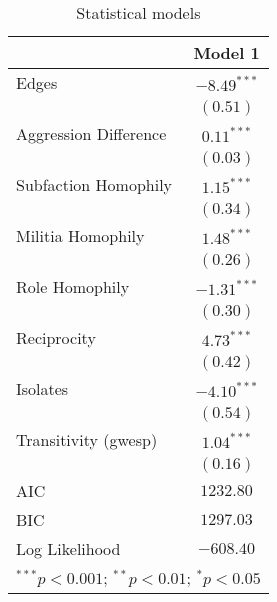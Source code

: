 
\begin{table}
\begin{center}
\begin{tabular}{l c}
\hline
 & Model 1 \\
\hline
Edges                 & $-8.49^{***}$ \\
                      & $(0.51)$      \\
Aggression Difference & $0.11^{***}$  \\
                      & $(0.03)$      \\
Subfaction Homophily  & $1.15^{***}$  \\
                      & $(0.34)$      \\
Militia Homophily     & $1.48^{***}$  \\
                      & $(0.26)$      \\
Role Homophily        & $-1.31^{***}$ \\
                      & $(0.30)$      \\
Reciprocity           & $4.73^{***}$  \\
                      & $(0.42)$      \\
Isolates              & $-4.10^{***}$ \\
                      & $(0.54)$      \\
Transitivity (gwesp)  & $1.04^{***}$  \\
                      & $(0.16)$      \\
\hline
AIC                   & $1232.80$     \\
BIC                   & $1297.03$     \\
Log Likelihood        & $-608.40$     \\
\hline
\multicolumn{2}{l}{\scriptsize{$^{***}p<0.001$; $^{**}p<0.01$; $^{*}p<0.05$}}
\end{tabular}
\caption{Statistical models}
\label{tab:ergm-DD}
\end{center}
\end{table}
